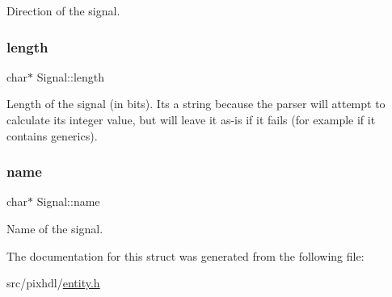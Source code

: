 Direction of the signal. \mbox{\label{struct_signal_a64c670733f0f14bc0733ef85ce26c210}} 
\subsubsection{\texorpdfstring{length}{length}}
{\footnotesize\ttfamily char$\ast$ Signal\+::length}

Length of the signal (in bits). It\textquotesingle{}s a string because the parser will attempt to calculate its integer value, but will leave it as-\/is if it fails (for example if it contains generics). \mbox{\label{struct_signal_aa56a667fa506981792ae32a5320217f3}} 
\subsubsection{\texorpdfstring{name}{name}}
{\footnotesize\ttfamily char$\ast$ Signal\+::name}

Name of the signal. 

The documentation for this struct was generated from the following file\+:\begin{DoxyCompactItemize}
\item 
src/pixhdl/\mbox{\hyperlink{entity_8h}{entity.\+h}}\end{DoxyCompactItemize}
